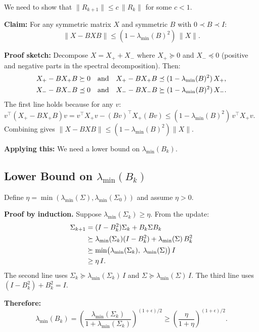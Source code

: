 \documentclass[11pt, a4paper]{article}
\theoremstyle{definition}
\begin{document}
We need to show that $\|R_{k+1}\| \leq c\,\|R_k\|$ for some $c < 1$.

\begin{calculation}[title={Bounding $\|R_{k+1}\| = \|R_k - B_k R_k B_k\|$}]
\textbf{Claim:} For any symmetric matrix $X$ and symmetric $B$ with $0 \prec B \prec I$:
\[
    \|X - BXB\| \leq (1 - \lambda_{\min}(B)^2)\,\|X\|.
\]

\textbf{Proof sketch:} Decompose $X = X_+ + X_-$ where $X_+ \succeq 0$ and $X_- \preceq 0$ (positive and negative parts in the spectral decomposition). Then:
\begin{align}
    X_+ - BX_+B &\succeq 0 \quad\text{and}\quad X_+ - BX_+B \preceq (1-\lambda_{\min}(B)^2)\,X_+, \notag \\
    X_- - BX_-B &\preceq 0 \quad\text{and}\quad X_- - BX_-B \succeq (1-\lambda_{\min}(B)^2)\,X_-. \notag
\end{align}
The first line holds because for any $v$: $v^\top(X_+ - BX_+B)v = v^\top X_+ v - (Bv)^\top X_+(Bv) \leq (1-\lambda_{\min}(B)^2)\,v^\top X_+ v$. Combining gives $\|X-BXB\| \leq (1-\lambda_{\min}(B)^2)\|X\|$.

\medskip
\textbf{Applying this:} We need a lower bound on $\lambda_{\min}(B_k)$.
\end{calculation}

\subsection{Lower Bound on $\lambda_{\min}(B_k)$}

\begin{calculation}[title={Showing $\lambda_{\min}(\Sigma_k) \geq \eta$ for all $k$}]
Define $\eta = \min(\lambda_{\min}(\Sigma), \lambda_{\min}(\Sigma_0))$ and assume $\eta > 0$.

\medskip
\textbf{Proof by induction.} Suppose $\lambda_{\min}(\Sigma_k) \geq \eta$. From the update:
\begin{align}
    \Sigma_{k+1} &= (I - B_k^2)\Sigma_k + B_k\Sigma B_k \notag \\
    &\succeq \lambda_{\min}(\Sigma_k)(I - B_k^2) + \lambda_{\min}(\Sigma)\,B_k^2 \notag \\
    &\succeq \min\bigl(\lambda_{\min}(\Sigma_k),\;\lambda_{\min}(\Sigma)\bigr)\,I \notag \\
    &\geq \eta\, I. \notag
\end{align}
The second line uses $\Sigma_k \succeq \lambda_{\min}(\Sigma_k)\,I$ and $\Sigma \succeq \lambda_{\min}(\Sigma)\,I$. The third line uses $(I-B_k^2) + B_k^2 = I$.

\medskip
\textbf{Therefore:}
\[
    \lambda_{\min}(B_k) = \left(\frac{\lambda_{\min}(\Sigma_k)}{1+\lambda_{\min}(\Sigma_k)}\right)^{(1+\epsilon)/2} \geq \left(\frac{\eta}{1+\eta}\right)^{(1+\epsilon)/2}.
\]
\end{calculation}
\end{document}
